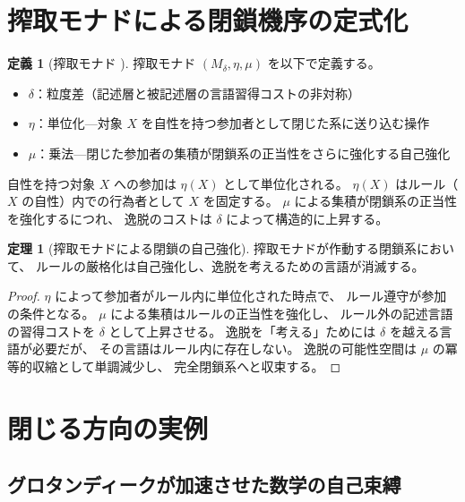 \documentclass[11pt,a4paper]{article}
\theoremstyle{definition}
\newtheorem{definition}{定義}[section]
\newtheorem{theorem}{定理}[section]
\begin{document}
\section{搾取モナドによる閉鎖機序の定式化}

\begin{definition}[搾取モナド \cite{Chiba2026_monad}]
搾取モナド $(M_\delta, \eta, \mu)$ を以下で定義する。
\begin{itemize}
  \item $\delta$：粒度差（記述層と被記述層の言語習得コストの非対称）
  \item $\eta$：単位化---対象 $X$ を自性を持つ参加者として閉じた系に送り込む操作
  \item $\mu$：乗法---閉じた参加者の集積が閉鎖系の正当性をさらに強化する自己強化
\end{itemize}
\end{definition}

自性を持つ対象 $X$ への参加は $\eta(X)$ として単位化される。
$\eta(X)$ はルール（$X$ の自性）内での行為者として $X$ を固定する。
$\mu$ による集積が閉鎖系の正当性を強化するにつれ、
逸脱のコストは $\delta$ によって構造的に上昇する。

\begin{theorem}[搾取モナドによる閉鎖の自己強化]
搾取モナドが作動する閉鎖系において、
ルールの厳格化は自己強化し、逸脱を考えるための言語が消滅する。
\end{theorem}

\begin{proof}
$\eta$ によって参加者がルール内に単位化された時点で、
ルール遵守が参加の条件となる。
$\mu$ による集積はルールの正当性を強化し、
ルール外の記述言語の習得コストを $\delta$ として上昇させる。
逸脱を「考える」ためには $\delta$ を越える言語が必要だが、
その言語はルール内に存在しない。
逸脱の可能性空間は $\mu$ の冪等的収縮として単調減少し、
完全閉鎖系へと収束する。
\end{proof}

\section{閉じる方向の実例}

\subsection{グロタンディークが加速させた数学の自己束縛}
\end{document}
